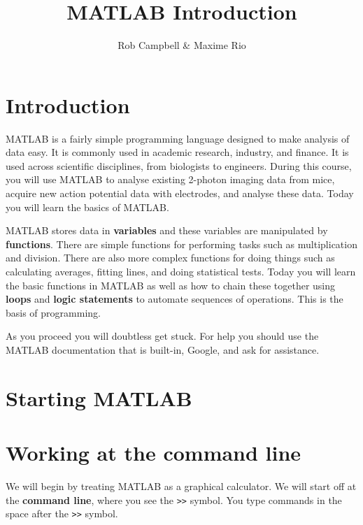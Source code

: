 \documentclass{article}
\title{MATLAB Introduction}
\author{Rob Campbell \& Maxime Rio}
\begin{document}
\maketitle


\section*{Introduction}

MATLAB is a fairly simple programming language designed to make analysis of data easy.
It is commonly used in academic research, industry, and finance.
It is used across scientific disciplines, from biologists to engineers.
During this course, you will use MATLAB to analyse existing 2-photon imaging data from mice, acquire new action potential data with electrodes, and analyse these data.
Today you will learn the basics of MATLAB.

MATLAB stores data in \textbf{variables} and these variables are manipulated by \textbf{functions}.
There are simple functions for performing tasks such as multiplication and division.
There are also more complex functions for doing things such as calculating averages, fitting lines, and doing statistical tests.
Today you will learn the basic functions in MATLAB as well as how to chain these together using \textbf{loops} and \textbf{logic statements} to automate sequences of operations.
This is the basis of programming.

As you proceed you will doubtless get stuck.
For help you should use the MATLAB documentation that is built-in, Google, and ask for assistance.


\section{Starting MATLAB}



\section{Working at the command line}

We will begin by treating MATLAB as a graphical calculator.
We will start off at the \textbf{command line}, where you see the \verb|>>| symbol.
You type commands in the space after the \verb|>>| symbol.
\end{document}

